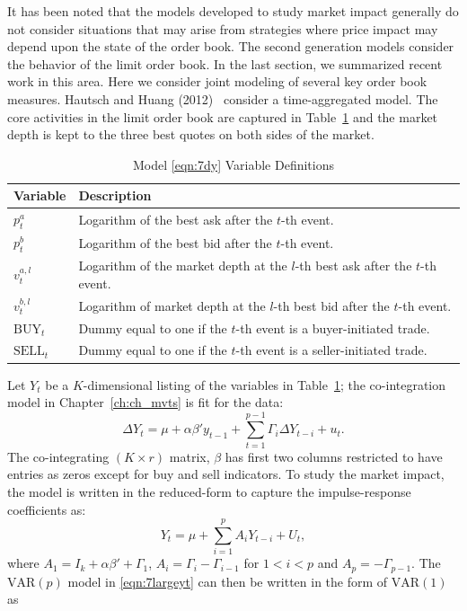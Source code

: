 It has been noted that the models developed to study market impact generally do not consider situations that may arise from strategies where price impact may depend upon the state of the order book. The second generation models consider the behavior of the limit order book. In the last section, we summarized recent work in this area. Here we consider joint modeling of several key order book measures. Hautsch and Huang (2012)~\cite{hauthuang} consider a time-aggregated model. The core activities in the limit order book are captured in Table~\ref{tab:vardef} and the market depth is kept to the three best quotes on both sides of the market.
	\begin{table}[!ht]
	\centering
	\caption{Model \eqref{eqn:7dy} Variable Definitions\label{tab:vardef}}
	\begin{tabular}{ll}
	Variable & Description \\ \hline
	$p_t^a$ & Logarithm of the best ask after the $t$-th event. \\
	$p_t^b$ & Logarithm of the best bid after the $t$-th event. \\
	$v_t^{a,l}$ & Logarithm of the market depth at the $l$-th best ask after the $t$-th event. \\
	$v_t^{b,l}$ & Logarithm of market depth at the $l$-th best bid after the $t$-th event. \\
	$\text{BUY}_t$ & Dummy equal to one if the $t$-th event is a buyer-initiated trade. \\
	$\text{SELL}_t$ & Dummy equal to one if the $t$-th event is a seller-initiated trade. 
	\end{tabular} 
	\end{table}
Let $Y_t$ be a $K$-dimensional listing of the variables in Table~\ref{tab:vardef}; the co-integration model in Chapter~\ref{ch:ch_mvts} is fit for the data:
	\begin{equation} \label{eqn:7dy}
	\Delta Y_t = \mu + \alpha \beta' y_{t-1} + \sum_{t=1}^{p-1} \Gamma_i \Delta Y_{t-i} + u_t.
	\end{equation}
The co-integrating $(K \times r)$ matrix, $\beta$ has first two columns restricted to have entries as zeros except for buy and sell indicators. To study the market impact, the model is written in the reduced-form to capture the impulse-response coefficients as:
	\begin{equation} \label{eqn:7largeyt}
	Y_t = \mu + \sum_{i=1}^p A_i Y_{t-i} + U_t,
	\end{equation}
where $A_1= I_k + \alpha\beta' + \Gamma_1$, $A_i= \Gamma_i - \Gamma_{i-1}$ for $1 < i < p$ and $A_p= -\Gamma_{p-1}$. The $\text{VAR}(p)$ model in \eqref{eqn:7largeyt} can then be written in the form of $\text{VAR}(1)$ as 
